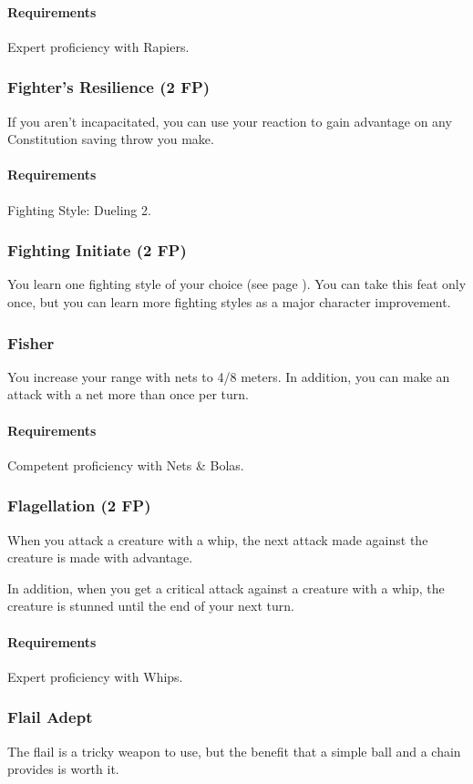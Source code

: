     \paragraph{Requirements} Expert proficiency with Rapiers.
\subsubsection{Fighter's Resilience (2 FP)} \label{feat::fightersresilience}
    If you aren't incapacitated, you can use your reaction to gain advantage on any Constitution saving throw you make.
    \paragraph{Requirements} Fighting Style: Dueling 2.
\subsubsection{Fighting Initiate (2 FP)} \label{feat::fightinginitiate}
    You learn one fighting style of your choice (see page \pageref{ssec::fightingstyles}).
    You can take this feat only once, but you can learn more fighting styles as a major character improvement.
\subsubsection{Fisher} \label{feat::fisher}
    You increase your range with nets to 4/8 meters.
    In addition, you can make an attack with a net more than once per turn.
    \paragraph{Requirements} Competent proficiency with Nets \& Bolas.
\subsubsection{Flagellation (2 FP)} \label{feat::flagellation}
    When you attack a creature with a whip, the next attack made against the creature is made with advantage.

    In addition, when you get a critical attack against a creature with a whip, the creature is stunned until the end of your next turn.
    \paragraph{Requirements} Expert proficiency with Whips.
\subsubsection{Flail Adept} \label{feat::flailadept}
    The flail is a tricky weapon to use, but the benefit that a simple ball and a chain provides is worth it.

